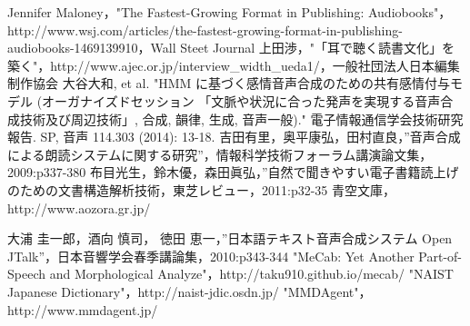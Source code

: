 \begin{thebibliography}{99}
 Jennifer Maloney，"The Fastest-Growing Format in Publishing: Audiobooks"，http://www.wsj.com/articles/the-fastest-growing-format-in-publishing-audiobooks-1469139910，Wall Steet Journal
 上田渉，"「耳で聴く読書文化」を築く"，http://www.ajec.or.jp/interview\_width\_ueda1/，一般社団法人日本編集制作協会
 大谷大和, et al. "HMM に基づく感情音声合成のための共有感情付与モデル (オーガナイズドセッション 「文脈や状況に合った発声を実現する音声合成技術及び周辺技術」, 合成, 韻律, 生成, 音声一般)." 電子情報通信学会技術研究報告. SP, 音声 114.303 (2014): 13-18.
 吉田有里，奥平康弘，田村直良，”音声合成による朗読システムに関する研究”，情報科学技術フォーラム講演論文集，2009:p337-380
 布目光生，鈴木優，森田眞弘，”自然で聞きやすい電子書籍読上げのための文書構造解析技術，東芝レビュー，2011:p32-35
 青空文庫，http://www.aozora.gr.jp/

 大浦 圭一郎，酒向 慎司， 徳田 恵一，”日本語テキスト音声合成システム Open JTalk”，日本音響学会春季講論集，2010:p343-344
 "MeCab: Yet Another Part-of-Speech and Morphological Analyze"，http://taku910.github.io/mecab/
 "NAIST Japanese Dictionary"，http://naist-jdic.osdn.jp/
 "MMDAgent"，http://www.mmdagent.jp/


\end{thebibliography}
